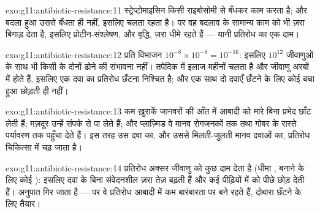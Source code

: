 \begin{solution}{exo:g11:antibiotic-resistance:11}
स्ट्रेप्टोमाइसिन किसी राइबोसोमी  से बँधकर काम करता है; और बदला हुआ
 उससे बँधता ही नहीं, इसलिए  चलता रहता है। पर वह बदलाव
 के सामान्य काम को भी ज़रा बिगाड़ देता है, इसलिए प्रोटीन-संश्लेषण,
और वृद्धि, ज़रा धीमे रहते हैं --- यानी प्रतिरोध का एक दाम।
\end{solution}

\begin{solution}{exo:g11:antibiotic-resistance:12}
प्रति विभाजन $10^{-8} \times 10^{-8} = 10^{-16}$: इसलिए $10^{12}$
जीवाणुओं के साथ भी किसी  के दोनों ढोने की संभावना नहीं। तपेदिक में
इलाज महीनों चलता है और जीवाणु अरबों में होते हैं, इसलिए एक दवा का प्रतिरोध
छँटना निश्चित है; और एक साथ दो दवाएँ छँटने के लिए कोई बचा हुआ छोड़ती ही
नहीं।
\end{solution}

\begin{solution}{exo:g11:antibiotic-resistance:13}
कम ख़ुराकें जानवरों की आँत में आबादी को मारे बिना  प्रभेद छाँट
लेती हैं; मज़दूर उन्हें संपर्क से पा लेते हैं; और प्लाज़्मिड वे  मानव
रोगजनकों तक तथा गोबर के रास्ते पर्यावरण तक पहुँचा देते हैं। इस तरह उस दवा
का, और उससे मिलती-जुलती मानव दवाओं का, प्रतिरोध चिकित्सा में चढ़ जाता है।
\end{solution}

\begin{solution}{exo:g11:antibiotic-resistance:14}
प्रतिरोध अक्सर जीवाणु को कुछ दाम देता है (धीमा , बनाने के लिए कोई
): इसलिए दवा के बिना संवेदनशील  ज़रा तेज़ बढ़ती हैं और कई
पीढ़ियों में  को पीछे छोड़ देती हैं। अनुपात गिर जाता है ---
पर वे प्रतिरोध  आबादी में कम बारंबारता पर बने रहते हैं, दोबारा छँटने के
लिए तैयार।
\end{solution}

